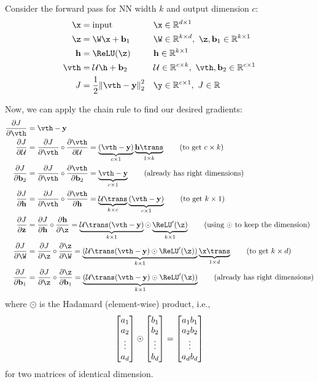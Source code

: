 \documentclass[class=cs480,notes,tikz]{agony}
\begin{document}
Consider the forward pass for NN width $k$ and output dimension $c$:
\begin{align*}
  \x    & = \text{input}                   &  & \x \in \R^{d\times 1}                                    \\
  \z    & = \W\x + \vb b_1                 &  & \W \in \R^{k \times d},\ \z,\vb b_1 \in \R^{k \times 1}  \\
  \vb h & = \ReLU(\z)                      &  & \vb h \in \R^{k \times 1}                                \\
  \vth  & = \U\h + \vb b_2                 &  & \U \in \R^{c\times k},\ \vth,\vb b_2 \in \R^{c \times 1} \\
  J     & = \frac12\norm{\vth - \vb y}_2^2 &  & \y \in \R^{c \times 1},\ J \in \R
\end{align*}

Now, we can apply the chain rule to find our desired gradients:
\begin{align*}
  \pdv{J}{\vth}    & = \vth - \vb y                                                                                                                                                                 \\
  \pdv{J}{\U}      & = \pdv{J}{\vth} \circ \pdv{\vth}{\U} = \underbrace{(\vth - \vb y)}_{c \times 1}\underbrace{\vb h\trans}_{1 \times k} \tag{to get $c\times k$}                                  \\
  \pdv{J}{\vb b_2} & = \pdv{J}{\vth} \circ \pdv{\vth}{\vb b_2} = \underbrace{\vth - \vb y}_{c \times 1} \tag{already has right dimensions}                                                          \\
  \pdv{J}{\vb h}   & = \pdv{J}{\vth} \circ \pdv{\vth}{\vb h} = \underbrace{\U\trans}_{k \times c}\underbrace{(\vth - \vb y)}_{c \times 1} \tag{to get $k \times 1$}                                 \\
  \pdv{J}{\vb z}   & = \pdv{J}{\vb h} \circ \pdv{\vb h}{\z} = \underbrace{\U\trans(\vth - \vb y)}_{k \times 1} \odot \underbrace{\ReLU'(\z)}_{k \times 1} \tag{using $\odot$ to keep the dimension} \\
  \pdv{J}{\W}      & = \pdv{J}{\z} \circ \pdv{\z}{\W} = \underbrace{(\U\trans(\vth - \vb y)\odot\ReLU'(\z))}_{k \times 1}\underbrace{\x\trans}_{1 \times d} \tag{to get $k \times d$}               \\
  \pdv{J}{\vb b_1} & = \pdv{J}{\z} \circ \pdv{\z}{\vb b_1} = \underbrace{(\U\trans(\vth - \vb y)\odot\ReLU'(\z))}_{k \times 1} \tag{already has right dimensions}
\end{align*}
where $\odot$ is the Hadamard (element-wise) product, i.e.,
\[
  \mqty[a_1\\a_2\\\vdots\\a_d] \odot \mqty[b_1\\b_2\\\vdots\\b_d] = \mqty[a_1b_1\\a_2b_2\\\vdots\\a_db_d]
\]
for two matrices of identical dimension.
\end{document}
